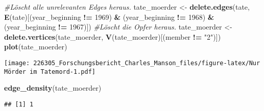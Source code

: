 \documentclass[
]{article}
\newenvironment{Shaded}{\begin{snugshade}}{\end{snugshade}}
\newcommand{\CommentTok}[1]{\textcolor[rgb]{0.56,0.35,0.01}{\textit{#1}}}
\newcommand{\DecValTok}[1]{\textcolor[rgb]{0.00,0.00,0.81}{#1}}
\newcommand{\KeywordTok}[1]{\textcolor[rgb]{0.13,0.29,0.53}{\textbf{#1}}}
\newcommand{\NormalTok}[1]{#1}
\newcommand{\OperatorTok}[1]{\textcolor[rgb]{0.81,0.36,0.00}{\textbf{#1}}}
\newcommand{\StringTok}[1]{\textcolor[rgb]{0.31,0.60,0.02}{#1}}
\begin{document}
\begin{Shaded}
\begin{Highlighting}[]
\CommentTok{#Löscht alle unrelevanten Edges heraus.}
\NormalTok{tate_moerder <-}
\StringTok{  }\KeywordTok{delete.edges}\NormalTok{(tate, }\KeywordTok{E}\NormalTok{(tate)[(year_beginning }\OperatorTok{!=}\StringTok{ }\DecValTok{1969}\NormalTok{) }\OperatorTok{&}
\StringTok{                               }\NormalTok{(year_beginning }\OperatorTok{!=}\StringTok{ }\DecValTok{1968}\NormalTok{) }\OperatorTok{&}\StringTok{ }\NormalTok{(year_beginning }\OperatorTok{!=}\StringTok{ }\DecValTok{1967}\NormalTok{)])}
\CommentTok{#Löscht die Opfer heraus.}
\NormalTok{tate_moerder <-}
\StringTok{  }\KeywordTok{delete.vertices}\NormalTok{(tate_moerder, }\KeywordTok{V}\NormalTok{(tate_moerder)[(member }\OperatorTok{!=}\StringTok{ "2"}\NormalTok{)])}
\KeywordTok{plot}\NormalTok{(tate_moerder)}
\end{Highlighting}
\end{Shaded}

\texttt{[image: 226305\_Forschungsbericht\_Charles\_Manson\_files/figure-latex/Nur Mörder im Tatemord-1.pdf]}

\begin{Shaded}
\begin{Highlighting}[]
\KeywordTok{edge_density}\NormalTok{(tate_moerder)}
\end{Highlighting}
\end{Shaded}

\begin{verbatim}
## [1] 1
\end{verbatim}
\end{document}
